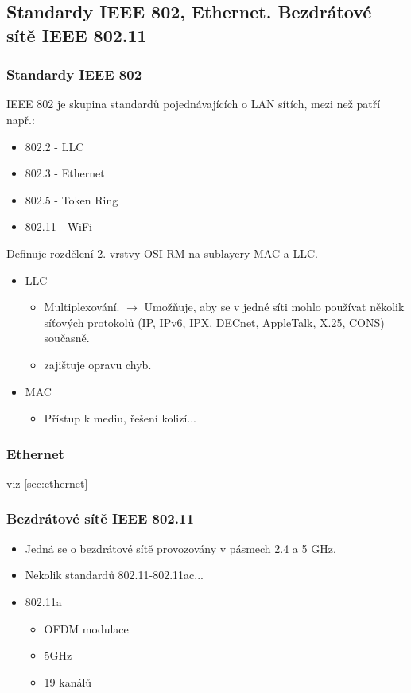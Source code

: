\documentclass[10pt,a4paper]{article}
\begin{document}
\subsection{Standardy IEEE 802, Ethernet. Bezdrátové sítě IEEE 802.11}
\subsubsection{Standardy IEEE 802}
IEEE 802 je skupina standardů pojednávajících o LAN sítích, mezi než patří např.:
\begin{itemize}
\item 802.2 - LLC
\item 802.3 - Ethernet
\item 802.5 - Token Ring
\item 802.11 - WiFi
\end{itemize}
Definuje rozdělení 2. vrstvy OSI-RM na sublayery MAC a LLC.
\begin{itemize}
\item LLC
\begin{itemize}
\item Multiplexování. $\rightarrow$ Umožňuje, aby se v jedné síti mohlo používat několik síťových protokolů (IP, IPv6, IPX, DECnet, AppleTalk, X.25, CONS) současně.
\item zajištuje opravu chyb.
\end{itemize}
\item MAC
\begin{itemize}
\item Přístup k mediu, řešení kolizí...
\end{itemize}
\end{itemize}
\subsubsection{Ethernet} 
viz \ref{sec:ethernet}
\subsubsection{Bezdrátové sítě IEEE 802.11}
\begin{itemize}
\item Jedná se o bezdrátové sítě provozovány v pásmech 2.4 a 5 GHz.
\item Nekolik standardů 802.11-802.11ac...
\item 802.11a
\begin{itemize}
\item OFDM modulace
\item 5GHz
\item 19 kanálů
\end{itemize}
\end{itemize}
\end{document}
